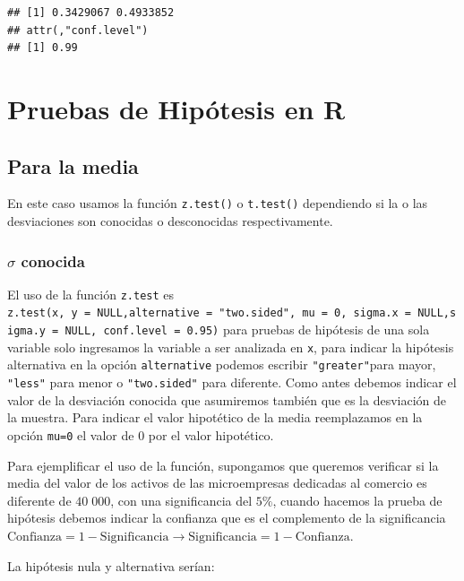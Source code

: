\documentclass[letterpaper,]{book}
\begin{document}
\begin{verbatim}
## [1] 0.3429067 0.4933852
## attr(,"conf.level")
## [1] 0.99
\end{verbatim}

\hypertarget{pruebas-de-hipotesis-en-r}{%
\section{Pruebas de Hipótesis en R}\label{pruebas-de-hipotesis-en-r}}

\hypertarget{para-la-media-1}{%
\subsection{Para la media}\label{para-la-media-1}}

En este caso usamos la función \texttt{z.test()} o \texttt{t.test()} dependiendo si la o las desviaciones son conocidas o desconocidas respectivamente.

\hypertarget{sigma-conocida}{%
\subsubsection{\texorpdfstring{\(\sigma\) conocida}{\textbackslash{}sigma conocida}}\label{sigma-conocida}}

El uso de la función \texttt{z.test} es \texttt{z.test(x,\ y\ =\ NULL,alternative\ =\ "two.sided",\ mu\ =\ 0,\ sigma.x\ =\ NULL,sigma.y\ =\ NULL,\ conf.level\ =\ 0.95)} para pruebas de hipótesis de una sola variable solo ingresamos la variable a ser analizada en \texttt{x}, para indicar la hipótesis alternativa en la opción \texttt{alternative} podemos escribir \texttt{"greater"}para mayor, \texttt{"less"} para menor o \texttt{"two.sided"} para diferente. Como antes debemos indicar el valor de la desviación conocida que asumiremos también que es la desviación de la muestra.
Para indicar el valor hipotético de la media reemplazamos en la opción \texttt{mu=0} el valor de \(0\) por el valor hipotético.

Para ejemplificar el uso de la función, supongamos que queremos verificar si la media del valor de los activos de las microempresas dedicadas al comercio es diferente de \(40\;000\), con una significancia del \(5\%\), cuando hacemos la prueba de hipótesis debemos indicar la confianza que es el complemento de la significancia \(\text{Confianza}=1- \text{Significancia} \rightarrow \text{Significancia}=1-\text{Confianza}\).

La hipótesis nula y alternativa serían:
\end{document}
